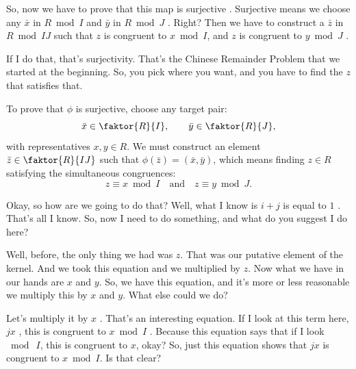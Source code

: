 \begin{proofWrapper}
\begin{speech}[00:09:25 - 00:10:38]
So, now we have to prove that this map is surjective . Surjective means we choose any $\bar{x}$ in $R \bmod I$ and $\bar{y}$ in $R \bmod J$ . Right? Then we have to construct a $\bar{z}$ in $R \bmod IJ$  such that $z$ is congruent to $x \bmod I$, and $z$ is congruent to $y \bmod J$ .

If I do that, that's surjectivity. That's the Chinese Remainder Problem that we started at the beginning. So, you pick where you want, and you have to find the $z$ that satisfies that.
\end{speech}

\begin{content}
To prove that $\phi$ is surjective, choose any target pair:
\[
\bar{x} \in \faktor{R}{I}, \qquad \bar{y} \in \faktor{R}{J},
\]
with representatives $x, y \in R$. We must construct an element $\bar{z} \in \faktor{R}{IJ}$ such that $\phi(\bar{z}) = (\bar{x}, \bar{y})$, which means finding $z \in R$ satisfying the simultaneous congruences:
\begin{equation}\label{eq:crt-target-congruences}
z \equiv x \bmod I \quad \text{and} \quad z \equiv y \bmod J.
\end{equation}
\end{content}

\begin{speech}[00:10:38 - 00:12:02]
Okay, so how are we going to do that? Well, what I know is $i + j$ is equal to $1$ . That's all I know. So, now I need to do something, and what do you suggest I do here?

Well, before, the only thing we had was $z$. That was our putative element of the kernel. And we took this equation and we multiplied by $z$. Now what we have in our hands are $x$ and $y$. So, we have this equation, and it's more or less reasonable we multiply this by $x$ and $y$. What else could we do?

Let's multiply it by $x$ . That's an interesting equation. If I look at this term here, $jx$ , this is congruent to $x \bmod I$ . Because this equation says that if I look $\bmod\ I$, this is congruent to $x$, okay? So, just this equation shows that $jx$ is congruent to $x \bmod I$. Is that clear?


\end{speech}
\end{proofWrapper}
